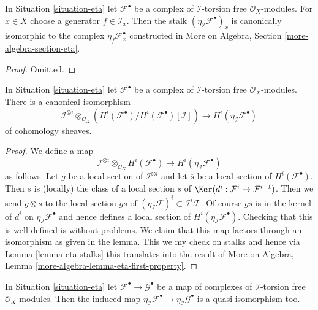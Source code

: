 \begin{lemma}
\label{lemma-eta-stalks}
In Situation \ref{situation-eta}
let $\mathcal{F}^\bullet$ be a complex of $\mathcal{I}$-torsion free
$\mathcal{O}_X$-modules.
For $x \in X$ choose a generator $f \in \mathcal{I}_x$. Then
the stalk $(\eta_\mathcal{I}\mathcal{F}^\bullet)_x$ is canonically
isomorphic to the complex $\eta_f\mathcal{F}^\bullet_x$ constructed
in More on Algebra, Section \ref{more-algebra-section-eta}.
\end{lemma}

\begin{proof}
Omitted.
\end{proof}

\begin{lemma}
\label{lemma-eta-first-property}
In Situation \ref{situation-eta}
let $\mathcal{F}^\bullet$ be a complex of $\mathcal{I}$-torsion free
$\mathcal{O}_X$-modules. There is a canonical isomorphism
$$
\mathcal{I}^{\otimes i} \otimes_{\mathcal{O}_X}
\left(
H^i(\mathcal{F}^\bullet)/H^i(\mathcal{F}^\bullet)[\mathcal{I}]
\right)
\longrightarrow H^i(\eta_\mathcal{I}\mathcal{F}^\bullet)
$$
of cohomology sheaves.
\end{lemma}

\begin{proof}
We define a map
$$
\mathcal{I}^{\otimes i} \otimes_{\mathcal{O}_X} H^i(\mathcal{F}^\bullet)
\longrightarrow
H^i(\eta_\mathcal{I}\mathcal{F}^\bullet)
$$
as follows. Let $g$ be a local section of $\mathcal{I}^{\otimes i}$
and let $\overline{s}$ be a local section of $H^i(\mathcal{F}^\bullet)$.
Then $\overline{s}$ is (locally) the class of a local section $s$ of
$\Ker(d^i : \mathcal{F}^i \to \mathcal{F}^{i + 1})$.
Then we send $g \otimes \overline{s}$ to the local section
$gs$ of $(\eta_\mathcal{I}\mathcal{F})^i \subset \mathcal{I}^i\mathcal{F}$.
Of course $gs$ is in the kernel of $d^i$ on
$\eta_\mathcal{I}\mathcal{F}^\bullet$ and hence defines a local
section of $H^i(\eta_\mathcal{I}\mathcal{F}^\bullet)$.
Checking that this is well defined is without problems.
We claim that this map factors through an isomorphism
as given in the lemma. This we my check on stalks and hence
via Lemma \ref{lemma-eta-stalks} this translates into the result of
More on Algebra, Lemma \ref{more-algebra-lemma-eta-first-property}.
\end{proof}

\begin{lemma}
\label{lemma-eta-qis}
In Situation \ref{situation-eta}
let $\mathcal{F}^\bullet \to \mathcal{G}^\bullet$ be a map of
complexes of $\mathcal{I}$-torsion free $\mathcal{O}_X$-modules.
Then the induced map
$\eta_\mathcal{I}\mathcal{F}^\bullet \to \eta_\mathcal{I}\mathcal{G}^\bullet$
is a quasi-isomorphism too.
\end{lemma}

